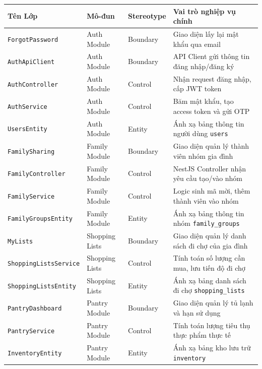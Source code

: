 \documentclass[../main.tex]{subfiles}
\begin{document}
\begin{longtable}{|>{\raggedright\arraybackslash}p{4.5cm}|>{\raggedright\arraybackslash}p{2.0cm}|>{\raggedright\arraybackslash}p{1.8cm}|>{\raggedright\arraybackslash}p{5.5cm}|}
\hline
\textbf{Tên Lớp} & \textbf{Mô-đun} & \textbf{Stereotype} & \textbf{Vai trò nghiệp vụ chính} \\ \hline
\endhead
\texttt{Forgot\-Password} & Auth Module & Boundary & Giao diện lấy lại mật khẩu qua email \\ \hline
\texttt{Auth\-Api\-Client} & Auth Module & Boundary & API Client gửi thông tin đăng nhập/đăng ký \\ \hline
\texttt{Auth\-Controller} & Auth Module & Control & Nhận request đăng nhập, cấp JWT token \\ \hline
\texttt{Auth\-Service} & Auth Module & Control & Băm mật khẩu, tạo access token và gửi OTP \\ \hline
\texttt{Users\-Entity} & Auth Module & Entity & Ánh xạ bảng thông tin người dùng \texttt{users} \\ \hline
\texttt{Family\-Sharing} & Family Module & Boundary & Giao diện quản lý thành viên nhóm gia đình \\ \hline
\texttt{Family\-Controller} & Family Module & Control & NestJS Controller nhận yêu cầu tạo/vào nhóm \\ \hline
\texttt{Family\-Service} & Family Module & Control & Logic sinh mã mời, thêm thành viên vào nhóm \\ \hline
\texttt{Family\-Groups\-Entity} & Family Module & Entity & Ánh xạ bảng thông tin nhóm \texttt{family\_groups} \\ \hline
\texttt{MyLists} & Shopping Lists & Boundary & Giao diện quản lý danh sách đi chợ của gia đình \\ \hline
\texttt{Shopping\-Lists\-Service}& Shopping Lists & Control & Tính toán số lượng cần mua, lưu tiến độ đi chợ \\ \hline
\texttt{Shopping\-Lists\-Entity} & Shopping Lists & Entity & Ánh xạ bảng danh sách đi chợ \texttt{shopping\_lists} \\ \hline
\texttt{Pantry\-Dashboard} & Pantry Module & Boundary & Giao diện quản lý tủ lạnh và hạn sử dụng \\ \hline
\texttt{Pantry\-Service} & Pantry Module & Control & Tính toán lượng tiêu thụ thực phẩm thực tế \\ \hline
\texttt{Inventory\-Entity} & Pantry Module & Entity & Ánh xạ bảng kho lưu trữ \texttt{inventory} \\ \hline

\end{longtable}
\end{document}
